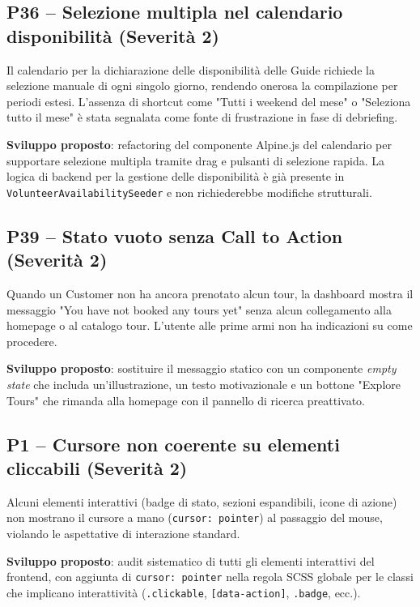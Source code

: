\subsection{P36 -- Selezione multipla nel calendario disponibilità (Severità 2)}

Il calendario per la dichiarazione delle disponibilità delle Guide richiede la selezione manuale di ogni singolo giorno, rendendo onerosa la compilazione per periodi estesi. L'assenza di shortcut come "Tutti i weekend del mese" o "Seleziona tutto il mese" è stata segnalata come fonte di frustrazione in fase di debriefing.

\textbf{Sviluppo proposto}: refactoring del componente Alpine.js del calendario per supportare selezione multipla tramite drag e pulsanti di selezione rapida. La logica di backend per la gestione delle disponibilità è già presente in \texttt{VolunteerAvailabilitySeeder} e non richiederebbe modifiche strutturali.

\subsection{P39 -- Stato vuoto senza Call to Action (Severità 2)}

Quando un Customer non ha ancora prenotato alcun tour, la dashboard mostra il messaggio "You have not booked any tours yet" senza alcun collegamento alla homepage o al catalogo tour. L'utente alle prime armi non ha indicazioni su come procedere.

\textbf{Sviluppo proposto}: sostituire il messaggio statico con un componente \textit{empty state} che includa un'illustrazione, un testo motivazionale e un bottone "Explore Tours" che rimanda alla homepage con il pannello di ricerca preattivato.

\subsection{P1 -- Cursore non coerente su elementi cliccabili (Severità 2)}

Alcuni elementi interattivi (badge di stato, sezioni espandibili, icone di azione) non mostrano il cursore a mano (\texttt{cursor: pointer}) al passaggio del mouse, violando le aspettative di interazione standard.

\textbf{Sviluppo proposto}: audit sistematico di tutti gli elementi interattivi del frontend, con aggiunta di \texttt{cursor: pointer} nella regola SCSS globale per le classi che implicano interattività (\texttt{.clickable}, \texttt{[data-action]}, \texttt{.badge}, ecc.).

